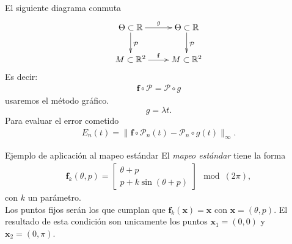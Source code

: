 \documentclass[11pt]{beamer}
\theoremstyle{definition}
\begin{document}
\begin{frame}
El siguiente diagrama conmuta
\begin{eqnarray}
\xymatrix{
	\Theta\subset\mathbb{R} \ar[d]^{\mathcal{P}} \ar[r]^{g} & \Theta\subset\mathbb{R} \ar[d]^{\mathcal{P}} \\
	M\subset\mathbb{R}^{2} \ar[r]^{\mathbf{f}} & M\subset\mathbb{R}^{2}
}\label{conmutativo}
\end{eqnarray}
Es decir:
\begin{eqnarray}
\mathbf{f} \circ \mathcal{P} =\mathcal{P}  \circ g
\label{Ecua de invariancia}
\end{eqnarray}
usaremos el m\'etodo gr\'afico.
\begin{equation}
g=\lambda t.
\end{equation}
Para evaluar el error cometido
\begin{eqnarray}
E_{n}(t) = \parallel \mathbf{f} \circ \mathcal{P}_{n}(t) - \mathcal{P}_{n} \circ g(t) \parallel_{\infty}.  \label{Ecua de invariancia resta}
\end{eqnarray}
\end{frame}




\begin{frame}{Ejemplo de aplicaci\'on al mapeo est\'andar}
El \textit{mapeo estándar} tiene la forma
\begin{eqnarray}
\mathbf{f}_{k}(\theta,p) = \left[\begin{array}{c}
\theta + p \\
p + k\sin(\theta +p)
\end{array}\right] \mod(2\pi),  \label{mapeo estandar}
\end{eqnarray}
con $k$ un parámetro. \\
Los puntos fijos ser\'an los que cumplan que $\mathbf{f}_{k}(\mathbf{x})=\mathbf{x}$
con $\mathbf{x}=(\theta,p)$. El resultado de esta condición son unicamente los puntos $\mathbf{x}_{1}=(0,0)$ y $\mathbf{x}_{2}=(0,\pi)$.

\end{frame}
\end{document}
